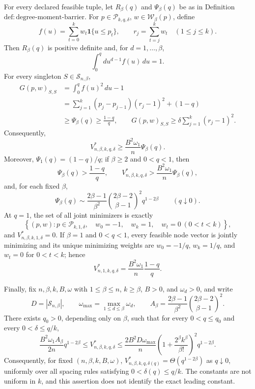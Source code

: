 For every declared feasible tuple, let \(R_\beta(q)\) and \(\Psi_\beta(q)\) be as in Definition~\(\mathrm{def{:}degree\text{-}moment\text{-}barrier}\).  For \(p\in\mathcal P_{k,q,\delta}\), \(w\in\mathcal W_\beta(p)\), define
\[
f(u)=\sum_{t=0}^kw_t\mathbf 1\{u\le p_t\},
\qquad r_j=\sum_{t=j}^kw_t\quad(1\le j\le k).
\]
Then \(R_\beta(q)\) is positive definite and, for \(d=1,\ldots,\beta\),
\[
\int_0^q d u^{d-1}f(u)\,du=1.
\]
For every singleton \(S\in\mathcal S_{n,\beta}\),
\[
\begin{aligned}
G(p,w)_{S,S}
&=\int_0^q f(u)^2\,du-1\\
&=\sum_{j=1}^k(p_j-p_{j-1})(r_j-1)^2+(1-q)\\
&\ge \Psi_\beta(q)\ge\frac{1-q}{q},
\qquad
G(p,w)_{S,S}\ge\delta\sum_{j=1}^k(r_j-1)^2.
\end{aligned}
\]
Consequently,
\[
V^*_{n,\beta,k,q,\delta}\ge
\frac{B^2\omega_1}{n}\Psi_\beta(q).
\]
Moreover, \(\Psi_1(q)=(1-q)/q\); if \(\beta\ge2\) and \(0<q<1\), then
\[
\Psi_\beta(q)>\frac{1-q}{q},
\qquad
V^*_{n,\beta,k,q,\delta}>
\frac{B^2\omega_1}{n}\Psi_\beta(q),
\]
and, for each fixed \(\beta\),
\[
\Psi_\beta(q)\sim
\frac{2\beta-1}{\beta^2}
\binom{2\beta-2}{\beta-1}^{\!2}q^{1-2\beta}
\qquad(q\downarrow0).
\]
At \(q=1\), the set of all joint minimizers is exactly
\[
\left\{(p,w):p\in\mathcal P_{k,1,\delta},\quad
w_0=-1,\quad w_k=1,\quad w_t=0\ (0<t<k)\right\},
\]
and \(V^*_{n,\beta,k,1,\delta}=0\).  If \(\beta=1\) and \(0<q<1\), every feasible node vector is jointly minimizing and its unique minimizing weights are \(w_0=-1/q\), \(w_k=1/q\), and \(w_t=0\) for \(0<t<k\); hence
\[
V^*_{n,1,k,q,\delta}=\frac{B^2\omega_1}{n}\frac{1-q}{q}.
\]

Finally, fix \(n,\beta,k,B,\omega\) with \(1\le\beta\le n\), \(k\ge\beta\), \(B>0\), and \(\omega_d>0\), and write
\[
D=|\mathcal S_{n,\beta}|,\qquad
\omega_{\max}=\max_{1\le d\le\beta}\omega_d,\qquad
A_\beta=\frac{2\beta-1}{\beta^2}\binom{2\beta-2}{\beta-1}^{\!2}.
\]
There exists \(q_0>0\), depending only on \(\beta\), such that for every \(0<q\le q_0\) and every \(0<\delta\le q/k\),
\[
\frac{B^2\omega_1A_\beta}{2n}q^{1-2\beta}
\le V^*_{n,\beta,k,q,\delta}
\le \frac{2B^2D\omega_{\max}}{n}
\left(1+\frac{2^\beta k^\beta}{\beta!}\right)^2q^{1-2\beta}.
\]
Consequently, for fixed \((n,\beta,k,B,\omega)\),
\(V^*_{n,\beta,k,q,\delta(q)}=\Theta(q^{1-2\beta})\) as \(q\downarrow0\), uniformly over all spacing rules satisfying \(0<\delta(q)\le q/k\).  The constants are not uniform in \(k\), and this assertion does not identify the exact leading constant.